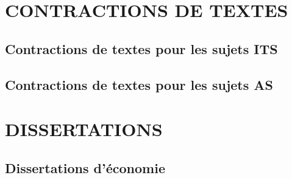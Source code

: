 \documentclass[openany, oneside, a4paper, 12pt]{book}
\begin{document}
\part{CONTRACTIONS DE TEXTES}

\chapter{Contractions de textes pour les sujets ITS}
%
%
%
%
%


\chapter{Contractions de textes pour les sujets AS}
%
%
%
%
%



\part{DISSERTATIONS}

\chapter{Dissertations d'économie}
%
%
%
%
%
%
%
%
%
%


%
%
%
%
%
\end{document}
